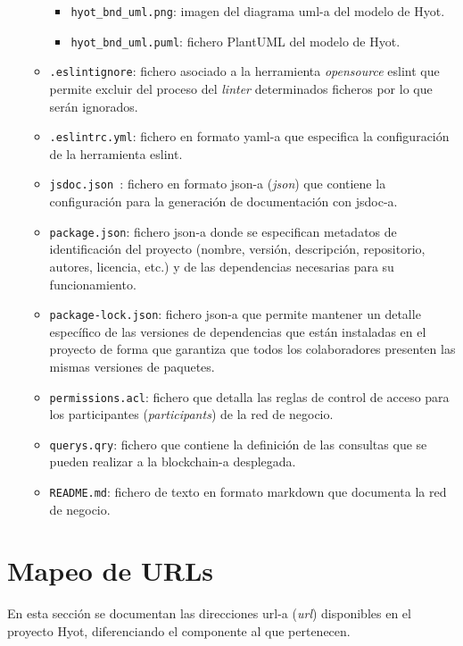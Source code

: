 \documentclass[12pt,a4paper, twoside]{report}
\begin{document}
\begin{itemize}
\begin{itemize}
				\begin{itemize}
				\item \texttt{hyot\_bnd\_uml.png}: imagen del diagrama \gls{uml-a} del modelo de Hyot.
				\item \texttt{hyot\_bnd\_uml.puml}: fichero PlantUML del modelo de Hyot.
			\end{itemize}
			\item \texttt{.eslintignore}: fichero asociado a la herramienta \textit{\gls{opensource}} \gls{eslint} que permite excluir del proceso del \textit{\gls{linter}} determinados ficheros por lo que serán ignorados.	
			\item \texttt{.eslintrc.yml}: fichero en formato \gls{yaml-a} que especifica la configuración de la herramienta \gls{eslint}.
			\item \texttt{jsdoc.json	}: fichero en formato \gls{json-a} (\textit{\gls{json}}) que contiene la configuración para la generación de documentación con \gls{jsdoc-a}.
			\item \texttt{package.json}: fichero \gls{json-a} donde se especifican metadatos de identificación del proyecto (nombre, versión, descripción, repositorio, autores, licencia, etc.) y de las dependencias necesarias para su funcionamiento.
			\item \texttt{package-lock.json}: fichero \gls{json-a} que permite mantener un detalle específico de las versiones de dependencias que están instaladas en el proyecto de forma que garantiza que todos los colaboradores presenten las mismas versiones de paquetes.
			\item \texttt{permissions.acl}: fichero que detalla las reglas de control de acceso para los participantes (\textit{\glspl{participant}}) de la red de negocio.
			\item \texttt{\glspl{query}.qry}: fichero que contiene la definición de las consultas que se pueden realizar a la \gls{blockchain-a} desplegada.
			\item \texttt{README.md}: fichero de texto en formato \gls{markdown} que documenta la red de negocio.
		\end{itemize}
	\end{itemize}
	
	\section{Mapeo de URLs} %
	
	En esta sección se documentan las direcciones \gls{url-a} (\textit{\gls{url}}) disponibles en el proyecto Hyot, diferenciando el componente al que pertenecen. \\
		
\end{document}
